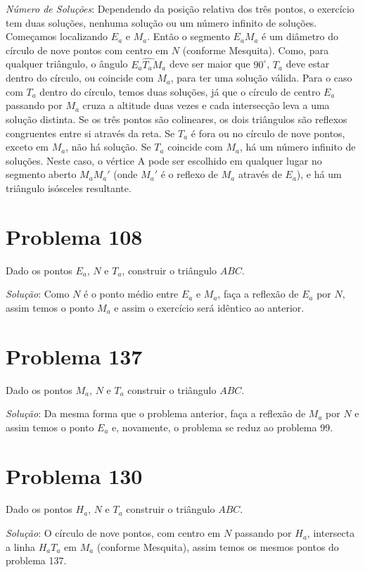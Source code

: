 \documentclass[12pt, openright, a4paper, brazil, openany, oneside]{abntex2}
\begin{document}
\textit{Número de Soluções}: Dependendo da posição relativa dos três pontos, o exercício tem duas soluções, nenhuma solução ou um número infinito de soluções. Começamos localizando $E_{a}$ e $M_{a}$. Então o segmento $E_{a}M_{a}$ é um diâmetro do círculo de nove pontos com centro em $N$ (conforme Mesquita\cite{mesquita2013}). Como, para qualquer triângulo, o ângulo $\hat{E_{a}T_{a}M_{a}}$ deve ser maior que $90^\circ$, $T_a$ deve estar dentro do círculo, ou coincide com $M_a$, para ter uma solução válida. Para o caso com $T_a$ dentro do círculo, temos duas soluções, já que o círculo de centro $E_{a}$ passando por $M_a$ cruza a altitude duas vezes e cada intersecção leva a uma solução distinta. Se os três pontos são colineares, os dois triângulos são reflexos congruentes entre si através da reta. Se $T_a$ é fora ou no círculo de nove pontos, exceto em $M_a$, não há solução. Se $T_a$ coincide com $M_a$, há um número infinito de soluções. Neste caso, o vértice A pode ser escolhido em qualquer lugar no segmento aberto $M_{a}M_{a}'$ (onde $M_{a}'$ é o reflexo de $M_{a}$ através de $E_a$), e há um triângulo isósceles resultante.

\section{Problema 108}

Dado os pontos $E_a$, $N$ e $T_a$, construir o triângulo $ABC$.

\textit{Solução}: Como $N$ é o ponto médio entre $E_a$ e $M_a$, faça a reflexão de $E_a$ por $N$, assim temos o ponto $M_a$ e assim o exercício será idêntico ao anterior.

\section{Problema 137}

Dado os pontos $M_a$, $N$ e $T_a$ construir o triângulo $ABC$.

\textit{Solução}: Da mesma forma que o problema anterior, faça a reflexão de $M_a$ por $N$ e assim temos o ponto $E_a$ e, novamente, o problema se reduz ao problema 99.

\section{Problema 130}

Dado os pontos $H_a$, $N$ e $T_a$ construir o triângulo $ABC$.

\textit{Solução}: O círculo de nove pontos, com centro em $N$ passando por $H_a$, intersecta a linha $H_{a}T_{a}$ em $M_a$ (conforme Mesquita\cite{mesquita2013}), assim temos os mesmos pontos do problema 137.


\end{document}
